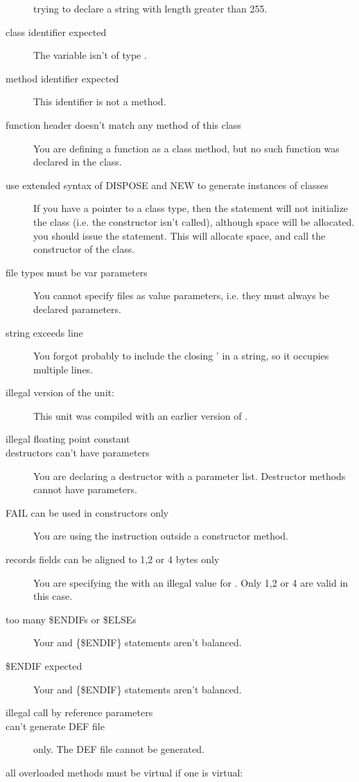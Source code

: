\documentclass{report}
\begin{document}
\begin{description}
trying to declare a string with length greater than 255.
\item [class identifier expected]
The variable isn't of type .
\item [method identifier expected]
This identifier is not a method.
\item [function header doesn't match any method of this class]
You are defining a function as a class method, but no such function was
declared in the class.
\item [use extended syntax of DISPOSE and NEW to generate instances of classes]
If you have a pointer  to a class type, then the statement
 will not initialize the class (i.e. the constructor isn't
called), although space will be allocated. you should issue the
 statement. This will allocate space, and call the
constructor of the class.
\item [file types must be var parameters]
You cannot specify files as value parameters, i.e. they must always be
declared  parameters.
\item [string exceeds line]
You forgot probably to include the closing ' in a string, so it occupies
multiple lines. 
\item [illegal version of the unit:]
This unit was compiled with an earlier version of \fpc.
\item [illegal floating point constant]
\item [destructors can't have parameters]
You are declaring a destructor with a parameter list. Destructor methods
cannot have parameters.
\item [FAIL can be used in constructors only]
You are using the  instruction outside a constructor method.
\item [records fields can be aligned to 1,2 or 4 bytes only]
You are specifying the  with an illegal value for
. Only 1,2 or 4 are valid in this case.
\item [too many \$ENDIFs or \$ELSEs]
Your  and {\{\$ENDIF\}} statements aren't balanced.
\item [\$ENDIF expected]
Your  and {\{\$ENDIF\}} statements aren't balanced.
\item [illegal call by reference parameters]
\item [can't generate DEF file]
\ostwo only. The DEF file cannot be generated.
\item [all overloaded methods must be virtual if one is virtual:]

\end{description}
\end{document}
